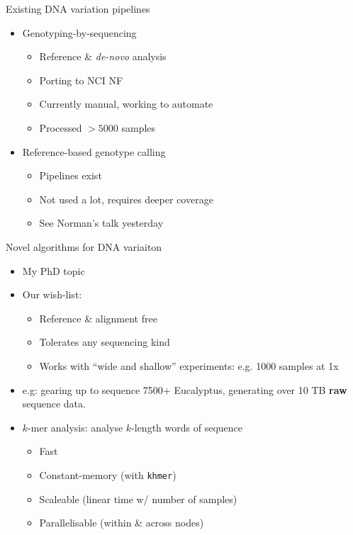 \documentclass[t]{beamer}
\begin{document}
\begin{frame}{Existing DNA variation pipelines}
  \begin{itemize}
    \item Genotyping-by-sequencing
      \begin{itemize}
        \item Reference \& \textit{de-novo} analysis
        \item Porting to NCI NF
        \item Currently manual, working to automate
        \item Processed $>5000$ samples
      \end{itemize}
    \item Reference-based genotype calling
      \begin{itemize}
        \item Pipelines exist
        \item Not used a lot, requires deeper coverage
        \item See Norman's talk yesterday
      \end{itemize}
  \end{itemize}
\end{frame}

\begin{frame}{Novel algorithms for DNA variaiton}
  \begin{itemize}
    \item My PhD topic
  \pause
    \item Our wish-list:
    \begin{itemize}
      \item Reference \& alignment free
      \item Tolerates any sequencing kind
      \item Works with ``wide and shallow'' experiments: e.g. 1000 samples at
            1x
    \end{itemize}
  \pause
    \item e.g: gearing up to sequence 7500+ Eucalyptus, generating over 10 TB
      \textbf{raw} sequence data.
  \pause
    \item $k$-mer analysis: analyse $k$-length words of sequence
    \begin{itemize}
      \item Fast
      \item Constant-memory (with \texttt{khmer})
      \item Scaleable (linear time w/ number of samples)
      \item Parallelisable (within \& across nodes)
    \end{itemize}
  \end{itemize}
\end{frame}
\end{document}
